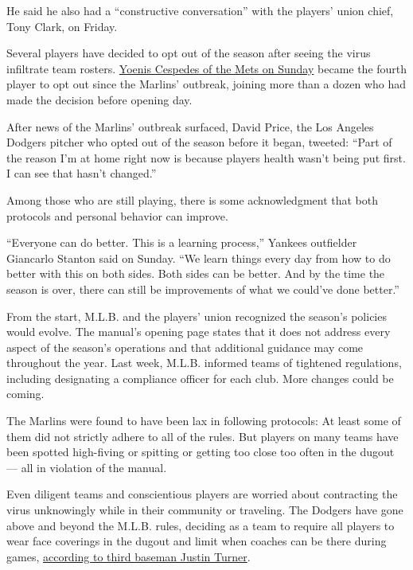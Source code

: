 He said he also had a ``constructive conversation'' with the players'
union chief, Tony Clark, on Friday.

Several players have decided to opt out of the season after seeing the
virus infiltrate team rosters.
\href{https://www.nytimes.com/2020/08/02/sports/baseball/Yoenis-cespedes-opt-out-rule.html}{Yoenis
Cespedes of the Mets on Sunday} became the fourth player to opt out
since the Marlins' outbreak, joining more than a dozen who had made the
decision before opening day.

After news of the Marlins' outbreak surfaced, David Price, the Los
Angeles Dodgers pitcher who opted out of the season before it began,
tweeted: ``Part of the reason I'm at home right now is because players
health wasn't being put first. I can see that hasn't changed.''

Among those who are still playing, there is some acknowledgment that
both protocols and personal behavior can improve.

``Everyone can do better. This is a learning process,'' Yankees
outfielder Giancarlo Stanton said on Sunday. ``We learn things every day
from how to do better with this on both sides. Both sides can be better.
And by the time the season is over, there can still be improvements of
what we could've done better.''

From the start, M.L.B. and the players' union recognized the season's
policies would evolve. The manual's opening page states that it does not
address every aspect of the season's operations and that additional
guidance may come throughout the year. Last week, M.L.B. informed teams
of tightened regulations, including designating a compliance officer for
each club. More changes could be coming.

The Marlins were found to have been lax in following protocols: At least
some of them did not strictly adhere to all of the rules. But players on
many teams have been spotted high-fiving or spitting or getting too
close too often in the dugout --- all in violation of the manual.

Even diligent teams and conscientious players are worried about
contracting the virus unknowingly while in their community or traveling.
The Dodgers have gone above and beyond the M.L.B. rules, deciding as a
team to require all players to wear face coverings in the dugout and
limit when coaches can be there during games,
\href{https://twitter.com/alannarizzo/status/1289371846425550848}{according
to third baseman Justin Turner}.

